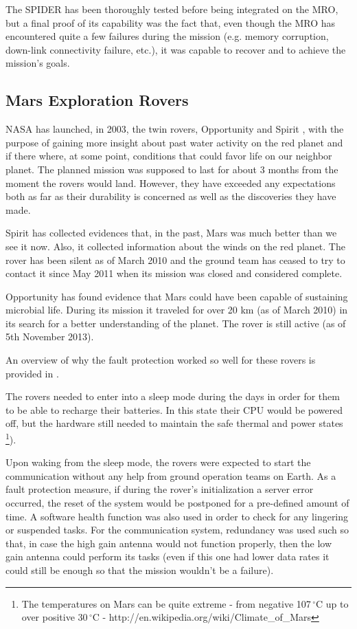 The SPIDER has been thoroughly tested before being integrated on the MRO, but a
final proof of its capability was the fact that, even though the MRO has
encountered quite a few failures during the mission (e.g. memory corruption,
down-link connectivity failure, etc.), it was capable to recover and to achieve
the mission's goals.

\subsection{Mars Exploration Rovers}

NASA has launched, in 2003, the twin rovers, Opportunity and Spirit
\cite{mer-nasa}, with the purpose of gaining more insight about past water
activity on the red planet and if there where, at some point, conditions that
could favor life on our neighbor planet. The planned mission was supposed to
last for about 3 months from the moment the rovers would land. However, they
have exceeded any expectations both as far as their durability is concerned as
well as the discoveries they have made.

Spirit has collected evidences that, in the past, Mars was much better than we
see it now. Also, it collected information about the winds on the red planet.
The rover has been silent as of March 2010 and the ground team has ceased to try
to contact it since May 2011 when its mission was closed and considered
complete.

Opportunity has found evidence that Mars could have been capable of sustaining
microbial life. During its mission it traveled for over 20 km (as of March 2010)
in its search for a better understanding of the planet. The rover is still
active (as of 5th November 2013).

An overview of why the fault protection worked so well for these rovers is
provided in \cite{surv-nasa-mars}.

The rovers needed to enter into a sleep mode during the days in order for them
to be able to recharge their batteries. In this state their CPU would be powered
off, but the hardware still needed to maintain the safe thermal and power states
\footnote{The temperatures on Mars can be quite extreme - from negative
107$\,^{\circ}\mathrm{C}$ up to over positive 30$\,^{\circ}\mathrm{C}$ -
http://en.wikipedia.org/wiki/Climate\_of\_Mars}).

Upon waking from the sleep mode, the rovers were expected to start the
communication without any help from ground operation teams on Earth. As a fault
protection measure, if during the rover's initialization a server error occurred,
the reset of the system would be postponed for a pre-defined amount of time. A
software health function was also used in order to check for any lingering or
suspended tasks. For the communication system, redundancy was used such so that,
in case the high gain antenna would not function properly, then the low gain
antenna could perform its tasks (even if this one had lower data rates it could
still be enough so that the mission wouldn't be a failure).

